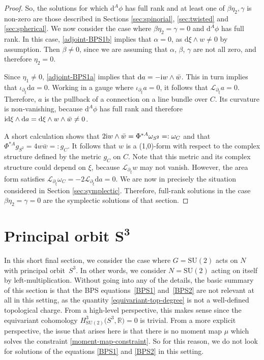 \documentclass[pdftex]{sigma}
\newcommand{\LL}{{\mathcal{L}}}
\newcommand{\SU}{{\mathrm{SU}}}
\newcommand{\R}{{\mathbb{R}}}
\newcommand{\1}{{\mathbb{1}}}
\def \d{\mathrm{d}}
\numberwithin{equation}{section}
\begin{document}
\begin{proof}
So, the solutions for which $\d^A\phi$ has full rank and at least one of $\beta\eta_2,\gamma$ is non-zero are those described in Sections \ref{sec:spinorial}, \ref{sec:twisted} and \ref{sec:spherical}. We now consider the case where $\beta\eta_2=\gamma=0$ and $\d^A\phi$ has full rank. In this case, \eqref{adjoint-BPS1b} implies that $\alpha=0$, as $\d\xi\wedge w\neq0$ by assumption. Then $\beta\neq0$, since we are assuming that $\alpha$, $\beta$, $\gamma$ are not all zero, and therefore $\eta_2=0$.

Since $\eta_1\neq0$, \eqref{adjoint-BPS1a} implies that $\d a = -{\rm i}w\wedge\bar{w}$. This in turn implies that $\iota_{\partial_\xi}\d a = 0$. Working in a gauge where $\iota_{\partial_\xi}a=0$, it follows that $\LL_{\partial_\xi}a=0$. Therefore, $a$ is the pullback of a connection on a line bundle over $C$. Its curvature is non-vanishing, because $\d^A\phi$ has full rank and therefore ${\rm i}\d\xi\wedge\d a=\d\xi\wedge w\wedge\bar{w}\neq 0$.

A short calculation shows that $2{\rm i}w\wedge\bar{w}=\Phi^{\ast A}\omega_{S^2}=:\omega_C$ and that $\Phi^{\ast A}g_{S^2}=4w\bar{w}=:g_C$. It follows that $w$ is a (1,0)-form with respect to the complex structure defined by the metric $g_C$ on $C$. Note that this metric and its complex structure could depend on $\xi$, because $\LL_{\partial_\xi}w$ may not vanish. However, the area form satisfies $\LL_{\partial_\xi}\omega_C = -2\LL_{\partial_\xi}\d a = 0$. We are now in precisely the situation considered in Section \ref{sec:symplectic}. Therefore, full-rank solutions in the case $\beta\eta_2=\gamma=0$ are the symplectic solutions of that section.
\end{proof}
\section[Principal orbit S\^{}3]{Principal orbit $\boldsymbol{S^3}$}\label{sec:princ-orbit-S3}

In this short final section, we consider the case where $G=\SU(2)$ acts on $N$ with principal orbit~$S^3$. In other words, we consider $N=\SU(2)$ acting on itself by left-multiplication. Without going into any of the details, the basic summary of this section is that the BPS equations~\eqref{BPS1} and~\eqref{BPS2} are not relevant at all in this setting, as the quantity \eqref{equivariant-top-degree} is not a well-defined topological charge. From a high-level perspective, this makes sense since the equivariant cohomology $H^3_{\SU(2)}\big(S^3,\R\big)=0$ is trivial. From a more explicit perspective, the issue that arises here is that there is no moment map $\mu$ which solves the constraint \eqref{moment-map-constraint}. So for this reason, we do not look for solutions of the equations \eqref{BPS1} and \eqref{BPS2} in this setting.
\end{document}
